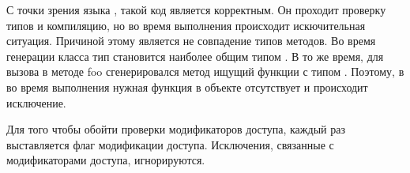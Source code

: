 С точки зрения языка , такой код является корректным. Он проходит проверку типов и компиляцию, но во время выполнения происходит искючительная ситуация. Причиной этому является не совпадение типов методов. Во время генерации класса  тип  становится наиболее общим типом . В то же время, для вызова в методе foo сгенерировался метод ищущий функции с типом . Поэтому, в во время выполнения нужная функция в объекте  отсутствует и происходит исключение.

Для того чтобы обойти проверки модификаторов доступа, каждый раз выставляется флаг модификации доступа. Исключения, связанные с модификаторами доступа, игнорируются.

